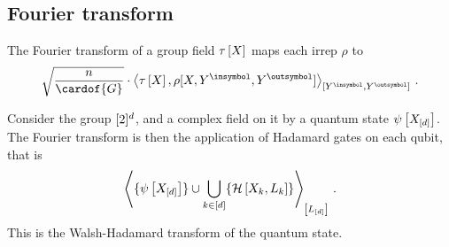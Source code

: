 \subsection{Fourier transform}

The Fourier transform of a group field $\tau\left[X\right]$ maps each irrep $\rho$ to
\begin{align*}
    \sqrt{\frac{\headdim}{\cardof{G}}} \cdot \contractionof{\hypercoreat{\catvariable},\rho[\catvariable,\cheadvariable{\insymbol},\cheadvariable{\outsymbol}]}{\cheadvariable{\insymbol},\cheadvariable{\outsymbol}} \, .
\end{align*}

\begin{example}
    Consider the group $[2]^{d}$, and a complex field on it by a quantum state $\psi\left[X_{[d]}\right]$.
    The Fourier transform is then the application of Hadamard gates on each qubit, that is
    \begin{align*}
        \left\langle 
            \{\psi\left[X_{[d]}\right]\}
            \cup \bigcup_{k\in[d]}
            \{\mathcal{H}\left[X_{k},L_{k}\right]\}
        \right\rangle_{\left[ L_{[d]} \right]} \, .
    \end{align*}
    This is the Walsh-Hadamard transform of the quantum state.
\end{example}